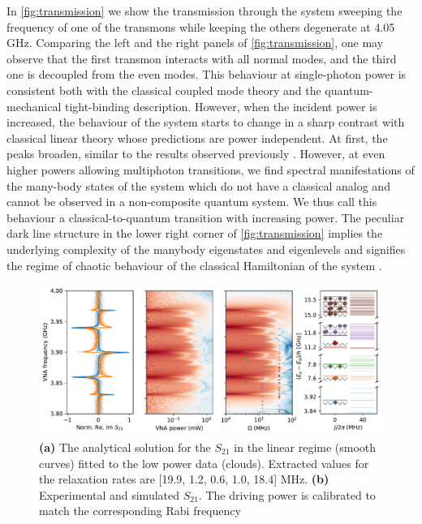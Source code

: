 \documentclass[%
 aps, prl,
 amsmath,amssymb,
 reprint,%
superscriptaddress
]{revtex4-2}
\begin{document}
In \autoref{fig:transmission} we show the transmission through the system sweeping the frequency of one of the transmons while keeping the others degenerate at 4.05 GHz. Comparing the left and the right panels of \autoref{fig:transmission}, one may observe that the first transmon interacts with all normal modes, and the third one is decoupled from the even modes. This behaviour at single-photon power is consistent both with the classical coupled mode theory and the quantum-mechanical tight-binding description. However, when the incident power is increased, the behaviour of the system starts to change in a sharp contrast with classical linear theory whose predictions are power independent. At first, the peaks broaden, similar to the results observed previously \cite{astafiev2010resonance}. However, at even higher powers allowing multiphoton transitions, we find spectral manifestations of the many-body states of the system which do not have a classical analog and cannot be observed in a non-composite quantum system. We thus call this behaviour a classical-to-quantum transition with increasing power. The peculiar dark line structure in the lower right corner of \autoref{fig:transmission} implies the underlying complexity of the manybody eigenstates and eigenlevels and signifies the regime of chaotic behaviour of the classical Hamiltonian of the system \cite{zimmermann1986manifestation}.


\begin{figure}
	\centering
	\includegraphics[width=0.9\linewidth]{Pictures/fig3}
	\caption{\textbf{(a)} The analytical solution for the $S_{21}$ in the linear regime (smooth curves) fitted to the low power data (clouds). Extracted values for the relaxation rates are [19.9,  1.2,  0.6,  1.0, 18.4] MHz. \textbf{(b)} Experimental and simulated $S_{21}$. The driving power is calibrated to match the corresponding Rabi frequency}
	\label{fig:cq_transition}
\end{figure}
\end{document}
